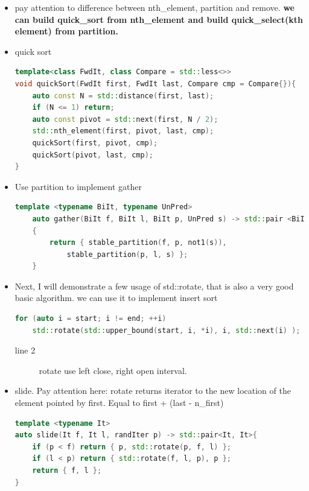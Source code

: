 \documentclass[a4paper,11pt,twoside]{book}
\begin{document}
\begin{itemize}
	\item pay attention to difference between nth\_element, partition and remove. \textbf{we can build quick\_sort from nth\_element and build quick\_select(kth element) from partition.} 


	\item quick sort
\begin{lstlisting}[frame=single, language=c++]	
template<class FwdIt, class Compare = std::less<>>
void quickSort(FwdIt first, FwdIt last, Compare cmp = Compare{}){
	auto const N = std::distance(first, last);
	if (N <= 1) return; 
	auto const pivot = std::next(first, N / 2);
	std::nth_element(first, pivot, last, cmp);
	quickSort(first, pivot, cmp); 
	quickSort(pivot, last, cmp); 
}	
\end{lstlisting}	

	\item Use partition to implement gather
\begin{lstlisting}[frame=single, language=c++]
	template <typename BiIt, typename UnPred> 
	auto gather(BiIt f, BiIt l, BiIt p, UnPred s) -> std::pair <BiIt, BiIt>
	{
		return { stable_partition(f, p, not1(s)), 
			stable_partition(p, l, s) };
	}
\end{lstlisting}
	
	
	\item Next, I will demonstrate a few usage of std::rotate, that is also a very good basic algorithm. we can use it to implement insert sort
\begin{lstlisting}[frame=single, language=c++]	
for (auto i = start; i != end; ++i)
	std::rotate(std::upper_bound(start, i, *i), i, std::next(i) );	
\end{lstlisting}
\begin{description}
	\item[line 2] rotate use left close, right open interval.
\end{description}	

	\item slide. Pay attention here: rotate returns iterator to the new location of the element pointed by first. Equal to first + (last - n\_first)
\begin{lstlisting}[frame=single, language=c++]
template <typename It> 
auto slide(It f, It l, randIter p) -> std::pair<It, It>{
	if (p < f) return { p, std::rotate(p, f, l) };
	if (l < p) return { std::rotate(f, l, p), p };
	return { f, l };
}
\end{lstlisting}

\end{itemize}
\end{document}
